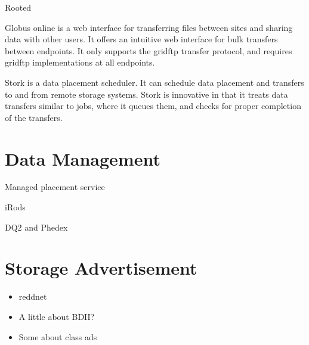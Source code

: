 Rooted

Globus online \cite{foster2011globus} is a web interface for transferring files between sites and sharing data with other users.  It offers an intuitive web interface for bulk transfers between endpoints.  It only supports the gridftp \cite{allcock2005globus} transfer protocol, and requires gridftp implementations at all endpoints.

Stork \cite{kosar2004stork} is a data placement scheduler.  It can schedule data placement and transfers to and from remote storage systems.  Stork is innovative in that it treats data transfers similar to jobs, where it queues them, and checks for proper completion of the transfers.

\section{Data Management}

Managed placement service

iRods 

DQ2 and Phedex

\section{Storage Advertisement}

\begin{itemize}
\item reddnet
\item A little about BDII?
\item Some about class ads
\end{itemize}




